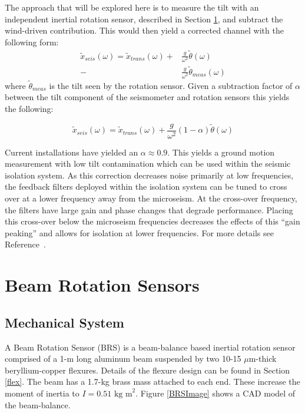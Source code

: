 \documentclass [12pt, proquest]{uwthesis}[2019]
\begin{document}
The approach that will be explored here is to measure the tilt with an independent inertial rotation sensor, described in Section \ref{BRSSec}, and subtract the wind-driven contribution. This would then yield a corrected channel with the following form:
\begin{align}
\tilde{x}_{seis}(\omega)=\tilde{x}_{trans}(\omega)+&\frac{g}{\omega^2}\tilde{\theta}(\omega)\\
-&\frac{g}{\omega^2}\tilde{\theta}_{meas}(\omega)
\end{align}
where $\tilde{\theta}_{meas}$ is the tilt seen by the rotation sensor. Given a subtraction factor of $\alpha$ between the tilt component of the seismometer and rotation sensors this yields the following:

\[\tilde{x}_{seis}(\omega)=\tilde{x}_{trans}(\omega)+\frac{g}{\omega^2}(1-\alpha)\tilde{\theta}(\omega)\]

Current installations have yielded an $\alpha\approx 0.9$. This yields a ground motion measurement with low tilt contamination which can be used within the seismic isolation system. As this correction decreases noise primarily at low frequencies, the feedback filters deployed within the isolation system can be tuned to cross over at a lower frequency away from the microseism. At the cross-over frequency, the filters have large gain and phase changes that degrade performance. Placing this cross-over below the microseism frequencies decreases the effects of this ``gain peaking'' and allows for isolation at lower frequencies. For more details see Reference~\cite{windproofing}.

\section{Beam Rotation Sensors} \label{BRSSec}
\subsection{Mechanical System}

\quad A Beam Rotation Sensor (BRS) is a beam-balance based inertial rotation sensor comprised of a 1-m long aluminum beam suspended by two 10-15 $\mu$m-thick beryllium-copper flexures. Details of the flexure design can be found in Section \ref{flex}. The beam has a 1.7-kg brass mass attached to each end. These increase the moment of inertia to $I=0.51\text{ kg m}^2$. Figure \ref{BRSImage} shows a CAD model of the beam-balance. 
\end{document}
